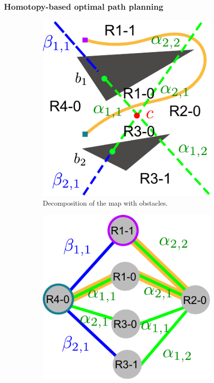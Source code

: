 \documentclass[phd]{byuprop}
\begin{document}
\subsubsection{Homotopy-based optimal path planning}

\begin{figure}[htbp]
	\centering
	\begin{subfigure}[t]{0.35\linewidth}
		\centering
		\includegraphics[width=\textwidth]{fig/obs_map.pdf}
		\caption{Decomposition of the map with obstacles.}
		\label{fig:obs_map:map}
	\end{subfigure}  
	\begin{subfigure}[t]{0.35\linewidth}
		\centering
		\includegraphics[width=\textwidth]{fig/obs_topology.pdf}

\end{subfigure}
\end{figure}
\end{document}
